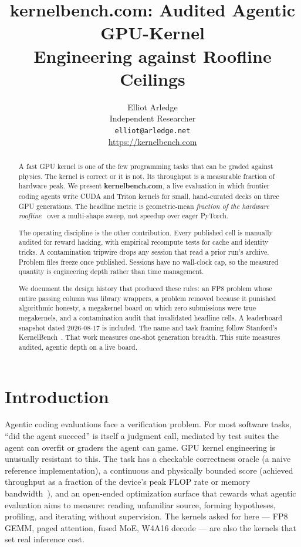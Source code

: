 \documentclass[11pt]{article}
\title{\textbf{kernelbench.com}: Audited Agentic GPU-Kernel\\Engineering against Roofline Ceilings}
\author{Elliot Arledge\\
Independent Researcher\\
\texttt{elliot@arledge.net}\\
\url{https://kernelbench.com}}
\date{}
\begin{document}
\maketitle

\begin{abstract}
A fast GPU kernel is one of the few programming tasks that can be graded against physics. The kernel is correct or it is not. Its throughput is a measurable fraction of hardware peak. We present \textbf{kernelbench.com}, a live evaluation in which frontier coding agents write CUDA and Triton kernels for small, hand-curated decks on three GPU generations. The headline metric is geometric-mean \emph{fraction of the hardware roofline}~\citep{williams2009roofline} over a multi-shape sweep, not speedup over eager PyTorch.

The operating discipline is the other contribution. Every published cell is manually audited for reward hacking, with empirical recompute tests for cache and identity tricks. A contamination tripwire drops any session that read a prior run's archive. Problem files freeze once published. Sessions have no wall-clock cap, so the measured quantity is engineering depth rather than time management.

We document the design history that produced these rules: an FP8 problem whose entire passing column was library wrappers, a problem removed because it punished algorithmic honesty, a megakernel board on which zero submissions were true megakernels, and a contamination audit that invalidated headline cells. A leaderboard snapshot dated 2026-08-17 is included. The name and task framing follow Stanford's KernelBench~\citep{ouyang2025kernelbench}. That work measures one-shot generation breadth. This suite measures audited, agentic depth on a live board.
\end{abstract}

\section{Introduction}
\label{sec:intro}

Agentic coding evaluations face a verification problem. For most software tasks, ``did the agent succeed'' is itself a judgment call, mediated by test suites the agent can overfit or graders the agent can game. GPU kernel engineering is unusually resistant to this. The task has a checkable correctness oracle (a naive reference implementation), a continuous and physically bounded score (achieved throughput as a fraction of the device's peak FLOP rate or memory bandwidth~\citep{williams2009roofline}), and an open-ended optimization surface that rewards what agentic evaluation aims to measure: reading unfamiliar source, forming hypotheses, profiling, and iterating without supervision. The kernels asked for here --- FP8 GEMM, paged attention, fused MoE, W4A16 decode --- are also the kernels that set real inference cost.
\end{document}

